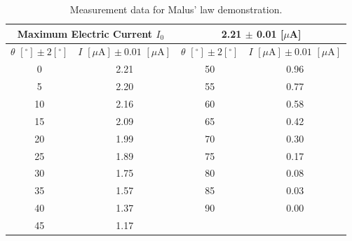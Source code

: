 \documentclass[a4paper]{article}
\begin{document}
\begin{table}[H]\centering
	\begin{tabular}{cc||cc}
		\hline
		\multicolumn{2}{c}{Maximum Electric Current $I_0$} & \multicolumn{2}{c}{2.21 $\pm$ 0.01 [$\mu$A]}                                                                                         \\
		\hline
		$\theta\,\,[^\circ] \pm 2[^\circ]$                 & $I\,\,[\mu\text{A}] \pm 0.01\,\,[\mu\text{A}]$ & $\theta\,\,[^\circ] \pm 2[^\circ]$ & $I\,\,[\mu\text{A}] \pm 0.01\,\,[\mu\text{A}]$ \\
		\hline
		0                                                  & 2.21                                           & 50                                 & 0.96                                           \\
		5                                                  & 2.20                                           & 55                                 & 0.77                                           \\
		10                                                 & 2.16                                           & 60                                 & 0.58                                           \\
		15                                                 & 2.09                                           & 65                                 & 0.42                                           \\
		20                                                 & 1.99                                           & 70                                 & 0.30                                           \\
		25                                                 & 1.89                                           & 75                                 & 0.17                                           \\
		30                                                 & 1.75                                           & 80                                 & 0.08                                           \\
		35                                                 & 1.57                                           & 85                                 & 0.03                                           \\
		40                                                 & 1.37                                           & 90                                 & 0.00                                           \\
		45                                                 & 1.17                                           &                                    &                                                \\
		\hline
	\end{tabular}
	\caption{Measurement data for Malus' law demonstration.}
	\label{table::Malus_Measure}
\end{table}
\end{document}
